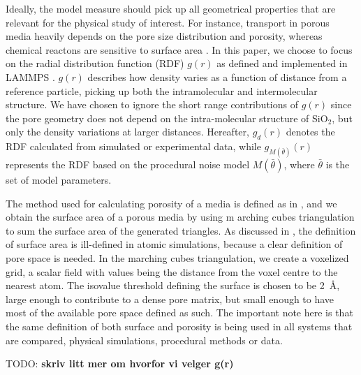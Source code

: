 \documentclass[aps,pre,twocolumn,letterpaper,floatfix,showpacs]{revtex4}
\newcommand{\todo}[1]{ {\color{Magenta} TODO: \color{Blue} \textbf{#1} }}
\begin{document}
Ideally, the model measure should pick up all geometrical properties that are relevant for the physical study of interest. 
For instance, transport in porous media heavily depends on the pore size distribution and porosity, whereas chemical reactons are sensitive to surface area \cite{coussy2011mechanics}.
In this paper, we choose to focus on the radial distribution function (RDF) $g(r)$ as defined and implemented in LAMMPS \cite{plimpton1995fast}. $g(r)$ describes how density varies as a function of distance from a reference particle, picking up both the intramolecular and intermolecular structure. 
We have chosen to ignore the short range contributions of $g(r)$ since the pore geometry does not depend on the intra-molecular structure of SiO$_2$, but only the density variations at larger distances. 
Hereafter, $g_d(r)$ denotes the RDF calculated from simulated or experimental data, while $g_{M(\bar \theta)}(r)$ represents the RDF based on the procedural noise model $M(\bar \theta)$, where $\bar \theta$ is the set of model parameters. 

The method used for calculating porosity of a media is defined as in \cite{gelb1998characterization}, and we obtain the surface area of a porous media by using m arching cubes triangulation to sum the surface area of the generated triangles.
As discussed in \cite{gelb1998characterization}, the definition of surface area is ill-defined in atomic simulations, because a clear definition of pore space is needed. 
In the marching cubes triangulation, we create a voxelized grid, a scalar field with values being the distance from the voxel centre to the nearest atom. 
The isovalue threshold defining the surface is chosen to be \SI{2}{\angstrom}, large enough to contribute to a dense pore matrix, but small enough to have most of the available pore space defined as such. 
The important note here is that the same definition of both surface and porosity is being used in all systems that are compared, physical simulations, procedural methods or data. 

\todo{skriv litt mer om hvorfor vi velger g(r)}


\end{document}
